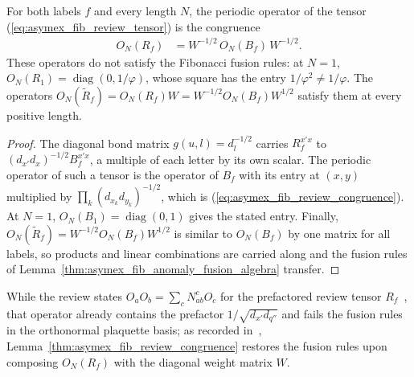 \begin{lemma}
    \label{thm:asymex_fib_review_congruence}
    \leanok
    For both labels $f$ and every length $N$, the periodic operator of the
    tensor (\ref{eq:asymex_fib_review_tensor}) is the congruence
    \begin{align}
        O_N(R_f) & =W^{-1/2}\,O_N(B_f)\,W^{-1/2}.
        \label{eq:asymex_fib_review_congruence}
    \end{align}
    These operators do not satisfy the Fibonacci fusion rules: at $N=1$,
    $O_N(R_1)=\operatorname{diag}(0,1/\varphi)$, whose square has the entry
    $1/\varphi^2\neq1/\varphi$. The operators
    $O_N(\widetilde R_f)=O_N(R_f)W=W^{-1/2}O_N(B_f)W^{1/2}$
    satisfy them at every positive length.
\end{lemma}

\begin{proof}
    \leanok
    The diagonal bond matrix $g(u,l)=d_l^{-1/2}$ carries $R_f^{x'x}$ to
    $(d_{x'}d_x)^{-1/2}B_f^{x'x}$, a multiple of each letter by its own
    scalar. The periodic operator of such a tensor is the operator of $B_f$
    with its entry at $(x,y)$ multiplied by $\prod_k(d_{x_k}d_{y_k})^{-1/2}$,
    which is (\ref{eq:asymex_fib_review_congruence}). At $N=1$,
    $O_N(B_1)=\operatorname{diag}(0,1)$ gives the stated entry. Finally,
    $O_N(\widetilde R_f)=W^{-1/2}O_N(B_f)W^{1/2}$ is similar to
    $O_N(B_f)$ by one matrix for all labels, so products and linear
    combinations are carried along and the fusion rules of
    Lemma~\ref{thm:asymex_fib_anomaly_fusion_algebra} transfer.
\end{proof}

While the review states $O_aO_b=\sum_cN_{ab}^cO_c$ for the prefactored
review tensor $R_f$~\cite[Section~3]{Cirac2021Matrix}, that operator already
contains the prefactor $1/\sqrt{d_{x'}d_{q''}}$ and fails the fusion rules
in the orthonormal plaquette basis; as recorded
in~\cite{gap:bmwshv17_fibonacci_block_entries_provenance},
Lemma~\ref{thm:asymex_fib_review_congruence} restores the fusion rules
upon composing $O_N(R_f)$ with the diagonal weight matrix $W$.

